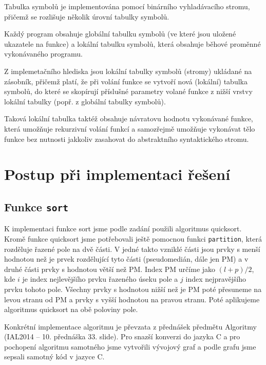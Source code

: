 \documentclass[12pt,a4paper,titlepage,final]{article}
\begin{document}
Tabulka symbolů je implementována pomocí binárního vyhladávacího stromu,
přičemž se rozlišuje několik úrovní tabulky symbolů.

Každý program obsahuje globální tabulku symbolů (ve které jsou uložené ukazatele
na funkce) a lokální tabulku symbolů, která obsahuje běhové proměnné
vykonávaného programu.

Z implemetačního hlediska jsou lokální tabulky symbolů (stromy) ukládané na
zásobník, přičemž platí, že při volání funkce se vytvoří nová (lokální)
tabulka symbolů, do které se skopírují příslušné parametry volané funkce z
nižší vrstvy lokální tabulky (popř. z globální tabulky symbolů).

Taková lokální tabulka taktéž obsahuje návratovu hodnotu vykonávané funkce,
která umožňuje rekurzivní volání funkcí a samozřejmě umožňuje vykonávat tělo
funkce bez nutnosti jakkoliv zasahovat do abstraktního syntaktického stromu.


\section{Postup při implementaci řešení} \label{postup_pri_implementaci_reseni}
\subsection{Funkce \texttt{sort}}
K implementaci funkce sort jsme podle zadání použili algoritmus quicksort.
Kromě funkce quicksort jsme potřebovali ještě pomocnou funkci \verb|partition|,
která rozděluje řazené pole na dvě části. V jedné takto vzniklé části jsou prvky
s menší hodnotou než je prvek rozdělující tyto části (pseudomedián, dále jen PM)
a v druhé části prvky s hodnotou větší než PM. Index PM určíme jako $(l+p)/2$, kde
$i$ je index nejlevějšího prvku řazeného úseku pole a $j$ index nejpravějšího prvku
tohoto pole. Všechny prvky s hodnotou nižší než je PM poté přesuneme na levou
stranu od PM a prvky s vyšší hodnotou na pravou stranu. Poté aplikujeme algoritmus
quicksort na obě poloviny pole.

Konkrétní implementace algoritmu je převzata z přednášek předmětu Algoritmy
(IAL2014 \cite{honzik2} -- 10. přednáška 33. slide). Pro snazší konverzi do jazyka
C a pro pochopení algoritmu samotného jsme vytvořili vývojový graf a podle grafu
jsme sepsali samotný kód v jazyce C.
\end{document}
